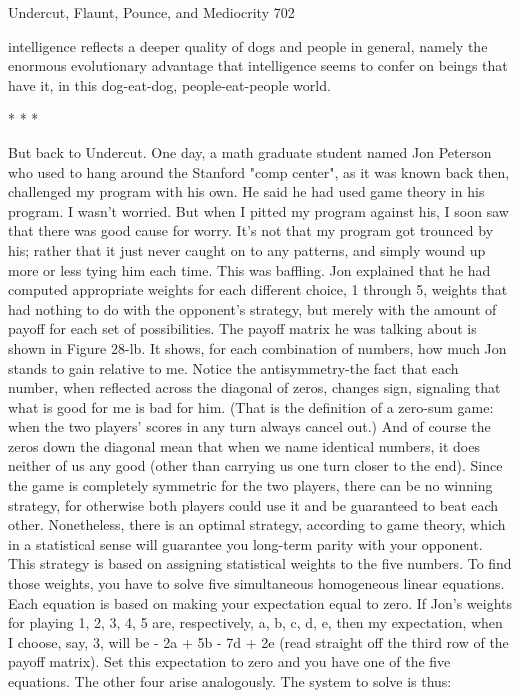 Undercut, Flaunt, Pounce, and Mediocrity                                               702

intelligence reflects a deeper quality of dogs and people in general, namely the
enormous evolutionary advantage that intelligence seems to confer on beings that
have it, in this dog-eat-dog, people-eat-people world.

                                        *   *   *

         But back to Undercut. One day, a math graduate student named Jon Peterson
who used to hang around the Stanford "comp center", as it was known back then,
challenged my program with his own. He said he had used game theory in his
program. I wasn't worried. But when I pitted my program against his, I soon saw that
there was good cause for worry. It's not that my program got trounced by his; rather
that it just never caught on to any patterns, and simply wound up more or less tying
him each time. This was baffling. Jon explained that he had computed appropriate
weights for each different choice, 1 through 5, weights that had nothing to do with the
opponent's strategy, but merely with the amount of payoff for each set of possibilities.
The payoff matrix he was talking about is shown in Figure 28-lb. It shows, for each
combination of numbers, how much Jon stands to gain relative to me. Notice the
antisymmetry-the fact that each number, when reflected across the diagonal of zeros,
changes sign, signaling that what is good for me is bad for him. (That is the definition
of a zero-sum game: when the two players' scores in any turn always cancel out.) And
of course the zeros down the diagonal mean that when we name identical numbers, it
does neither of us any good (other than carrying us one turn closer to the end).
         Since the game is completely symmetric for the two players, there can be no
winning strategy, for otherwise both players could use it and be guaranteed to beat
each other. Nonetheless, there is an optimal strategy, according to game theory, which
in a statistical sense will guarantee you long-term parity with your opponent. This
strategy is based on assigning statistical weights to the five numbers. To find those
weights, you have to solve five simultaneous homogeneous linear equations. Each
equation is based on making your expectation equal to zero. If Jon's weights for
playing 1, 2, 3, 4, 5 are, respectively, a, b, c, d, e, then my expectation, when I choose,
say, 3, will be - 2a + 5b - 7d + 2e (read straight off the third row of the payoff matrix).
Set this expectation to zero and you have one of the five equations. The other four
arise analogously. The system to solve is thus:

